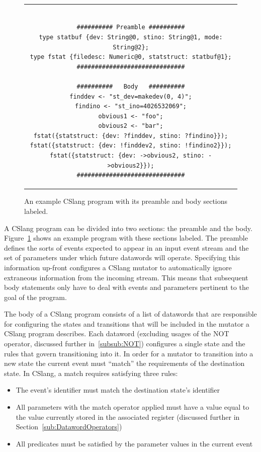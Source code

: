\begin{figure}[H]
\centering
\begin{tabular}{c}
\begin{lstlisting}

########## Preamble ##########
type statbuf {dev: String@0, stino: String@1, mode: String@2};
type fstat {filedesc: Numeric@0, statstruct: statbuf@1};
##############################

##########   Body   ##########
finddev <- "st_dev=makedev(0, 4)";
findino <- "st_ino=4026532069";
obvious1 <- "foo";
obvious2 <- "bar";
fstat({statstruct: {dev: ?finddev, stino: ?findino}});
fstat({statstruct: {dev: !finddev2, stino: !findino2}});
fstat({statstruct: {dev: ->obvious2, stino: ->obvious2}});
##############################

\end{lstlisting}
\end{tabular}
\caption{An example CSlang program with its preamble and body sections
  labeled.}
\label{lst:PreambleBody}
\end{figure}



A CSlang program can be divided into two sections: the preamble and the body.
Figure~\ref{lst:PreambleBody} shows an example program with these sections
labeled.
The preamble defines the sorts of events
expected
to appear in an input event stream and the set of parameters
under which future datawords will operate.  Specifying this information
up-front configures a CSlang mutator to
automatically ignore extraneous information from the incoming stream.  This
means that subsequent body statements only have to deal with events and
parameters pertinent to the goal of the program.

The body of a CSlang program consists of a list of datawords that
are responsible for configuring the states and transitions
that will be included in the mutator a CSlang program describes.
Each dataword (excluding usages of the NOT operator, discussed further
in~\ref{subsub:NOT}) configures a single
state and the rules that govern transitioning into it.
In order for a mutator to transition into a new state
the current event must ``match'' the requirements of the destination state.
In CSlang, a match requires satisfying three rules:

\begin{itemize}
\item{The event's identifier must match the destination state's identifier}
\item{All parameters with the match operator applied must have a value equal to
  the value currently stored in the associated register (discussed further
    in Section~\ref{sub:DatawordOperators})}
\item{All predicates must be satisfied by the parameter values in the
  current event}
\end{itemize}




